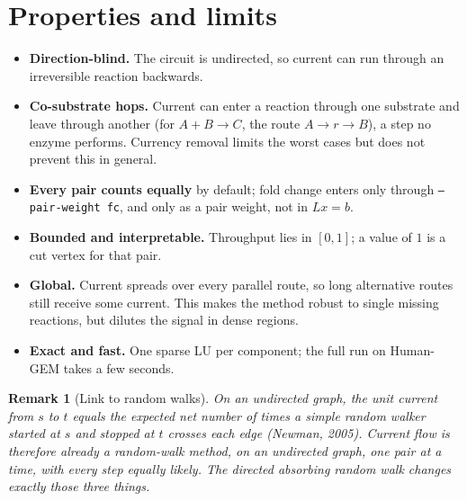 \documentclass[11pt]{article}
\newcommand{\code}[1]{\texttt{#1}}
\newtheorem*{remark}{Remark}
\begin{document}
\section{Properties and limits}
\begin{itemize}
  \item \textbf{Direction-blind.} The circuit is undirected, so current can run
        through an irreversible reaction backwards.
  \item \textbf{Co-substrate hops.} Current can enter a reaction through one
        substrate and leave through another (for $A+B\to C$, the route
        $A\to r\to B$), a step no enzyme performs. Currency removal limits the worst
        cases but does not prevent this in general.
  \item \textbf{Every pair counts equally} by default; fold change enters only
        through \code{--pair-weight fc}, and only as a pair weight, not in
        $Lx=b$.
  \item \textbf{Bounded and interpretable.} Throughput lies in $[0,1]$; a value of
        $1$ is a cut vertex for that pair.
  \item \textbf{Global.} Current spreads over every parallel route, so long
        alternative routes still receive some current. This makes the method
        robust to single missing reactions, but dilutes the signal in dense
        regions.
  \item \textbf{Exact and fast.} One sparse LU per component; the full run on
        Human-GEM takes a few seconds.
\end{itemize}

\begin{remark}[Link to random walks]
On an undirected graph, the unit current from $s$ to $t$ equals the expected net
number of times a simple random walker started at $s$ and stopped at $t$ crosses each
edge (Newman, 2005). Current flow is therefore already a random-walk method, on an
undirected graph, one pair at a time, with every step equally likely. The directed
absorbing random walk changes exactly those three things.
\end{remark}

\end{document}
